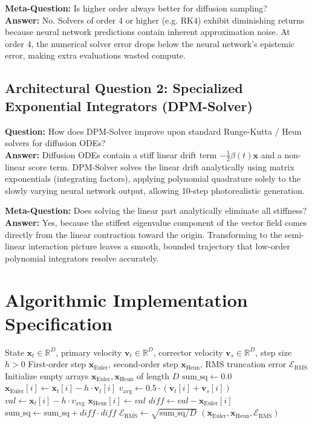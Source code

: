 \documentclass[11pt,a4paper]{article}
\theoremstyle{definition}
\begin{document}
\textbf{Meta-Question:} Is higher order always better for diffusion sampling?\\
\textbf{Answer:} No. Solvers of order 4 or higher (e.g. RK4) exhibit diminishing returns because neural network predictions contain inherent approximation noise. At order 4, the numerical solver error drops below the neural network's epistemic error, making extra evaluations wasted compute.

\subsection{Architectural Question 2: Specialized Exponential Integrators (DPM-Solver)}
\textbf{Question:} How does DPM-Solver improve upon standard Runge-Kutta / Heun solvers for diffusion ODEs?\\
\textbf{Answer:} Diffusion ODEs contain a stiff linear drift term $-\frac{1}{2}\beta(t)\mathbf{x}$ and a non-linear score term. DPM-Solver solves the linear drift analytically using matrix exponentials (integrating factors), applying polynomial quadrature solely to the slowly varying neural network output, allowing 10-step photorealistic generation.

\textbf{Meta-Question:} Does solving the linear part analytically eliminate all stiffness?\\
\textbf{Answer:} Yes, because the stiffest eigenvalue component of the vector field comes directly from the linear contraction toward the origin. Transforming to the semi-linear interaction picture leaves a smooth, bounded trajectory that low-order polynomial integrators resolve accurately.

\section{Algorithmic Implementation Specification}

\begin{algorithm}[H]
\caption{Second-Order Predictor-Corrector Heun Integration with Truncation Error Monitoring}
\begin{algorithmic}[1]
\Require State $\mathbf{x}_t \in \mathbb{R}^D$, primary velocity $\mathbf{v}_t \in \mathbb{R}^D$, corrector velocity $\mathbf{v}_s \in \mathbb{R}^D$, step size $h > 0$
\Ensure First-order step $\mathbf{x}_{\text{Euler}}$, second-order step $\mathbf{x}_{\text{Heun}}$, RMS truncation error $\mathcal{E}_{\text{RMS}}$
\State Initialize empty arrays $\mathbf{x}_{\text{Euler}}, \mathbf{x}_{\text{Heun}}$ of length $D$
\State $\text{sum\_sq} \gets 0.0$
    \State $\mathbf{x}_{\text{Euler}}[i] \gets \mathbf{x}_t[i] - h \cdot \mathbf{v}_t[i]$
    \State $v_{\text{avg}} \gets 0.5 \cdot (\mathbf{v}_t[i] + \mathbf{v}_s[i])$
    \State $val \gets \mathbf{x}_t[i] - h \cdot v_{\text{avg}}$
    \State $\mathbf{x}_{\text{Heun}}[i] \gets val$
    \State $diff \gets val - \mathbf{x}_{\text{Euler}}[i]$
    \State $\text{sum\_sq} \gets \text{sum\_sq} + diff \cdot diff$
\EndFor
\State $\mathcal{E}_{\text{RMS}} \gets \sqrt{\text{sum\_sq} / D}$
\State \Return $(\mathbf{x}_{\text{Euler}}, \mathbf{x}_{\text{Heun}}, \mathcal{E}_{\text{RMS}})$
\end{algorithmic}
\end{algorithm}
\end{document}
